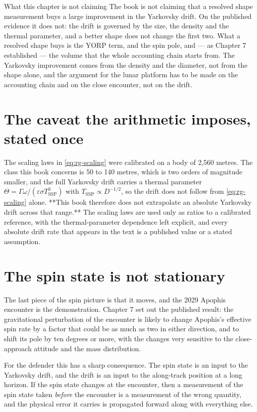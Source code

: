 \begin{deeper}{What this chapter is not claiming}
The book is not claiming that a resolved shape measurement buys a large
improvement in the Yarkovsky drift. On the published evidence it does not:
the drift is governed by the size, the density and the thermal parameter,
and a better shape does not change the first two. What a resolved shape buys
is the YORP term, and the spin pole, and --- as Chapter 7 established --- the
volume that the whole accounting chain starts from. The Yarkovsky
improvement comes from the density and the diameter, not from the shape
alone, and the argument for the lunar platform has to be made on the
accounting chain and on the close encounter, not on the drift.
\end{deeper}

\section{The caveat the arithmetic imposes, stated once}

The scaling laws in \eqref{eq:rg-scaling} were calibrated on a body of
2,560 metres. The class this book concerns is 50 to 140 metres, which is two
orders of magnitude smaller, and the full Yarkovsky drift carries a thermal
parameter \(\Theta = \Gamma\omega/(\varepsilon\sigma T_{\mathrm{SSP}}^{3})\)
with \(T_{\mathrm{SSP}} \propto D^{-1/2}\), so the drift does not follow from
\eqref{eq:rg-scaling} alone. **This book therefore does not extrapolate an
absolute Yarkovsky drift across that range.** The scaling laws are used only
as ratios to a calibrated reference, with the thermal-parameter dependence
left explicit, and every absolute drift rate that appears in the text is a
published value or a stated assumption.

\section{The spin state is not stationary}

The last piece of the spin picture is that it moves, and the 2029 Apophis
encounter is the demonstration. Chapter 7 set out the published result: the
gravitational perturbation of the encounter is likely to change Apophis's
effective spin rate by a factor that could be as much as two in either
direction, and to shift its pole by ten degrees or more, with the changes
very sensitive to the close-approach attitude and the mass distribution.

For the defender this has a sharp consequence. The spin state is an input to
the Yarkovsky drift, and the drift is an input to the along-track position
at a long horizon. If the spin state changes at the encounter, then a
measurement of the spin state taken \emph{before} the encounter is a
measurement of the wrong quantity, and the physical error it carries is
propagated forward along with everything else.

